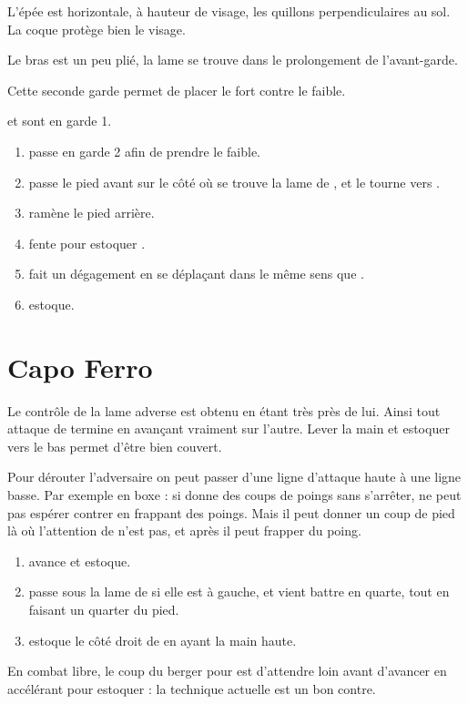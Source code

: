 \begin{garde}

L'épée est horizontale, à hauteur de visage, les quillons perpendiculaires au sol.
La coque protège bien le visage.
\end{garde}


\begin{garde}

Le bras est un peu plié, la lame se trouve dans le prolongement de l'avant-garde.
\end{garde}


Cette seconde garde permet de placer le fort contre le faible.


\begin{technique}
\A et \D sont en garde 1.

\begin{enumerate}
	\item \A passe en garde 2 afin de prendre le faible.
	\item \A passe le pied avant sur le côté où se trouve la lame de \D, et le tourne vers \D.
	\item \A ramène le pied arrière.
	\item \A fente pour estoquer \D.
	\item \D fait un dégagement en se déplaçant dans le même sens que \A.
	\item \D estoque.
\end{enumerate}

\end{technique}


\section{Capo Ferro}


Le contrôle de la lame adverse est obtenu en étant très près de lui.
Ainsi tout attaque de termine en avançant vraiment sur l'autre.
Lever la main et estoquer vers le bas permet d'être bien couvert.

Pour dérouter l'adversaire on peut passer d'une ligne d'attaque haute à une ligne basse.
Par exemple en boxe : si \A donne des coups de poings sans s'arrêter, \D ne peut pas espérer contrer en frappant des poings.
Mais il peut donner un coup de pied là où l'attention de \A n'est pas, et après il peut frapper du poing.


\begin{technique}

\begin{enumerate}
	\item \A avance et estoque.
	\item \D passe sous la lame de \D si elle est à gauche, et vient battre en quarte, tout en faisant un quarter du pied.
	\item \D estoque le côté droit de \A en ayant la main haute.
\end{enumerate}

En combat libre, le coup du berger pour \A est d'attendre loin avant d'avancer en accélérant pour estoquer : la technique actuelle est un bon contre.

\end{technique}



